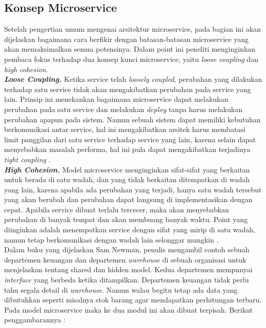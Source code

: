 \subsection{Konsep Microservice}
Setelah pengertian umum mengenai arsitektur microservice, pada bagian ini akan dijelaskan bagaimana cara berfikir dengan batasan-batasan microservice yang akan memaksimalkan semua potensinya. Dalam point ini peneliti menginginkan pembaca fokus terhadap dua konsep kunci microservice, yaitu \textit{loose coupling} dan \textit{high cohesion}.\\
\textbf{\textit{Loose Coupling.}} Ketika service telah \textit{loosely coupled}, perubahan yang dilakukan terhadap satu service tidak akan mengakibatkan perubahan pada service yang lain. Prinsip ini menekankan bagaimana microservice dapat melakukan perubahan pada satu service dan melakukan \textit{deploy} tanpa harus melakukan perubahan apapun pada sistem. Namun sebuah sistem dapat memiliki kebutuhan berkomunikasi antar service, hal ini mengakibatkan arsitek harus membatasi limit panggilan dari satu service terhadap service yang lain, karena selain dapat menyebabkan masalah performa, hal ini pula dapat mengakibatkan terjadinya \textit{tight coupling} \cite{9}.\\
\textbf{\textit{High Cohesion.}} Model microservice menginginkan sifat-sifat yang berkaitan untuk berada di satu wadah, dan yang tidak berkaitan ditempatkan di wadah yang lain, karena apabila ada perubahan yang terjadi, hanya satu wadah tersebut yang akan berubah dan perubahan dapat langsung di implementasikan dengan cepat. Apabila service dibuat terlalu tercecer, maka akan menyebabkan perubahan di banyak tempat dan akan membuang banyak waktu. Point yang diinginkan adalah menempatkan service dengan sifat yang mirip di satu wadah, namun tetap berkomunikasi dengan wadah lain selonggar mungkin \cite{9}.\\
Dalam buku yang dijelaskan Sam Newman, penulis mengambil contoh sebuah departemen keuangan dan departemen \textit{warehouse} di sebuah organisasi untuk menjelaskan tentang shared dan hidden model. Kedua departemen mempunyai \textit{interface} yang berbeda ketika ditampilkan. Departemen keuangan tidak perlu tahu segala detail di \textit{warehouse}. Namun walau begitu tetap ada data yang dibutuhkan seperti misalnya stok barang agar mendapatkan perhitungan terbaru. Pada model microservice maka ke dua modul ini akan dibuat terpisah. Berikut penggambarannya :\\

